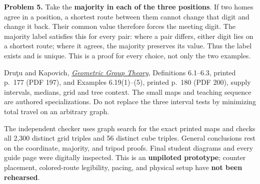 \documentclass[11pt,letterpaper]{article}
\newcommand{\heading}[1]{\par\vspace{5pt}{\large\bfseries #1}\par\nobreak}
\begin{document}
\textbf{Problem 5.} Take the \textbf{majority in each of the three positions}. If two homes agree in a position, a shortest route between them cannot change that digit and change it back. Their common value therefore forces the meeting digit. The majority label satisfies this for every pair: where a pair differs, either digit lies on a shortest route; where it agrees, the majority preserves its value. Thus the label exists and is unique. This is a proof for every choice, not only the two examples.

\heading{Sources and checking limits}
Dru\c{t}u and Kapovich, \href{https://www.math.ucdavis.edu/~kapovich/EPR/ggt.pdf}{\emph{Geometric Group Theory}}, Definitions 6.1--6.3, printed p.\ 177 (PDF 197), and Examples 6.19(1)--(5), printed p.\ 180 (PDF 200), supply intervals, medians, grid and tree context. The small maps and teaching sequence are authored specializations. Do not replace the three interval tests by minimizing total travel on an arbitrary graph.

The independent checker uses graph search for the exact printed maps and checks all 2,300 distinct grid triples and 56 distinct cube triples. General conclusions rest on the coordinate, majority, and tripod proofs. Final student diagrams and every guide page were digitally inspected. This is an \textbf{unpiloted prototype}; counter placement, colored-route legibility, pacing, and physical setup have \textbf{not been rehearsed}.
\end{document}
